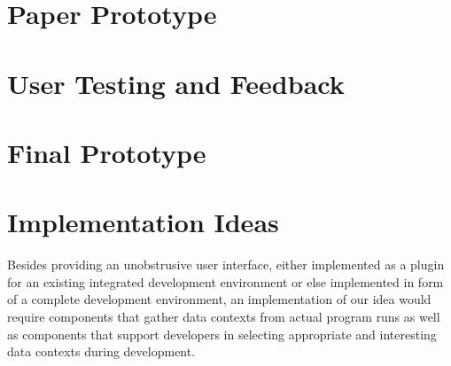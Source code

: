 \documentclass[runningheads]{llncs}
\begin{document}
\section{Paper Prototype} \label{sec:PAPER_PROTOTYPE}

\section{User Testing and Feedback} \label{sec:USER_TESTING}

\section{Final Prototype} \label{sec:FINAL_PROTOTYPE}

\section{Implementation Ideas} \label{sec:IMPLEMENTATION_IDEAS}
Besides providing an unobstrusive user interface, either implemented as a plugin for an existing integrated development environment or else implemented in form of a complete development environment, an implementation of our idea would require components that gather data contexts from actual program runs as well as components that support developers in selecting appropriate and interesting data contexts during development.

\end{document}
